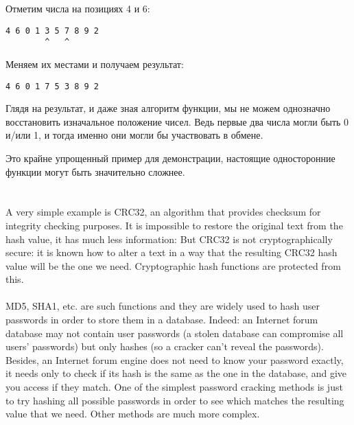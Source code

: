 Отметим числа на позициях 4 и 6:

\begin{lstlisting}
4 6 0 1 3 5 7 8 9 2
        ^   ^
\end{lstlisting}

Меняем их местами и получаем результат:

\begin{lstlisting}
4 6 0 1 7 5 3 8 9 2
\end{lstlisting}

Глядя на результат, и даже зная алгоритм функции, мы не можем однозначно восстановить изначальное
положение чисел.
Ведь первые два числа могли быть 0 и/или 1, и тогда именно они могли бы участвовать в обмене.

Это крайне упрощенный пример для демонстрации, настоящие односторонние функции могут быть значительно сложнее.
\fi %


\ifdefined\ENGLISH
\newcommand{\HashFuncChapterName}{%
}
\section{\HashFuncChapterName}
\label{hash_func}

\myindex{\HashFuncChapterName}
A very simple example is CRC32, an algorithm that provides  checksum for integrity checking purposes.
It is impossible to restore the original text from the hash value, it has much less information:
But CRC32 is not cryptographically secure: it is known how to alter a text in a way that the resulting
CRC32 hash value will be the one we need.
Cryptographic hash functions are protected from this. \\
\\
MD5, SHA1, etc. are such functions and they are widely used to hash user passwords in order to store them in a database.
Indeed: an Internet forum database may not contain user passwords 
(a stolen database can compromise all users' passwords) but only hashes 
(so a cracker can't reveal the passwords).
Besides, an Internet forum engine does not need to know your password exactly, it needs only to check if its hash
is the same as the one in the database, and give you access if they match.
One of the simplest password cracking methods is just to try hashing all possible passwords in order
to see which matches the resulting value that we need.
Other methods are much more complex.

